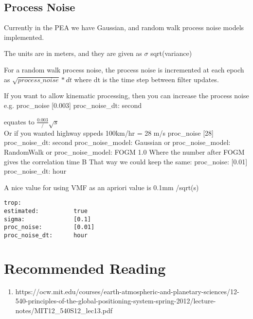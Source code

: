 

\subsection{Process Noise}

Currently in the PEA we have Gaussian, and random walk process noise models implemented.

The units are in meters, and they are given as $\sigma$ sqrt(variance)

For a random walk process noise, the process noise is incremented at each epoch as $\sqrt{process\_noise}*dt$ where dt is the time step between filter updates.

If you want to allow kinematic processing, then you can increase the process noise e.g.
proc\_noise [0.003]
proc\_noise\_dt: second 

equates to $\frac{0.003}/\sqrt{s}$
\\ 
Or if you wanted highway sppeds 100km/hr = 28 m/s
proc\_noise [28]
proc\_noise\_dt: second
proc\_noise\_model:   Gaussian
or
         proc\_noise\_model:   RandomWalk
or
         proc\_noise\_model:   FOGM 1.0
Where the number after FOGM gives the correlation time B
That way we could keep the same:
            proc\_noise:         [0.01]
            proc\_noise\_dt:      hour

A nice value for using VMF as an apriori value is 0.1mm /sqrt(s)
%
\begin{verbatim}
trop:
estimated:          true
sigma:              [0.1]
proc_noise:         [0.01]
proc_noise_dt:      hour
\end{verbatim}



\section{Recommended Reading}

\begin{enumerate}
    \item https://ocw.mit.edu/courses/earth-atmospheric-and-planetary-sciences/12-540-principles-of-the-global-positioning-system-spring-2012/lecture-notes/MIT12\_540S12\_lec13.pdf
\end{enumerate}

